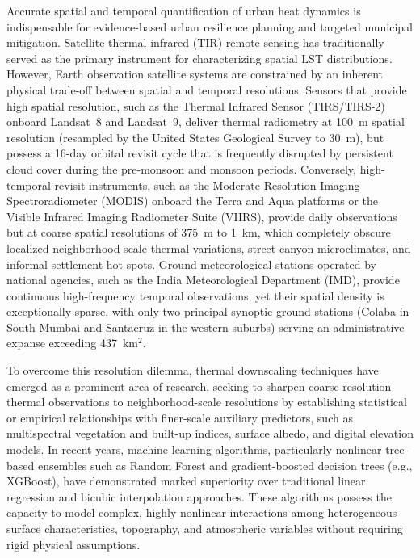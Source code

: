 \documentclass[a4paper,fleqn]{cas-sc}
\begin{document}
Accurate spatial and temporal quantification of urban heat dynamics is indispensable for evidence-based urban resilience planning and targeted municipal mitigation. Satellite thermal infrared (TIR) remote sensing has traditionally served as the primary instrument for characterizing spatial LST distributions. However, Earth observation satellite systems are constrained by an inherent physical trade-off between spatial and temporal resolutions. Sensors that provide high spatial resolution, such as the Thermal Infrared Sensor (TIRS/TIRS-2) onboard Landsat~8 and Landsat~9, deliver thermal radiometry at 100~m spatial resolution (resampled by the United States Geological Survey to 30~m), but possess a 16-day orbital revisit cycle that is frequently disrupted by persistent cloud cover during the pre-monsoon and monsoon periods. Conversely, high-temporal-revisit instruments, such as the Moderate Resolution Imaging Spectroradiometer (MODIS) onboard the Terra and Aqua platforms or the Visible Infrared Imaging Radiometer Suite (VIIRS), provide daily observations but at coarse spatial resolutions of 375~m to 1~km, which completely obscure localized neighborhood-scale thermal variations, street-canyon microclimates, and informal settlement hot spots. Ground meteorological stations operated by national agencies, such as the India Meteorological Department (IMD), provide continuous high-frequency temporal observations, yet their spatial density is exceptionally sparse, with only two principal synoptic ground stations (Colaba in South Mumbai and Santacruz in the western suburbs) serving an administrative expanse exceeding 437~km$^2$.

To overcome this resolution dilemma, thermal downscaling techniques have emerged as a prominent area of research, seeking to sharpen coarse-resolution thermal observations to neighborhood-scale resolutions by establishing statistical or empirical relationships with finer-scale auxiliary predictors, such as multispectral vegetation and built-up indices, surface albedo, and digital elevation models. In recent years, machine learning algorithms, particularly nonlinear tree-based ensembles such as Random Forest and gradient-boosted decision trees (e.g., XGBoost), have demonstrated marked superiority over traditional linear regression and bicubic interpolation approaches. These algorithms possess the capacity to model complex, highly nonlinear interactions among heterogeneous surface characteristics, topography, and atmospheric variables without requiring rigid physical assumptions.
\end{document}
